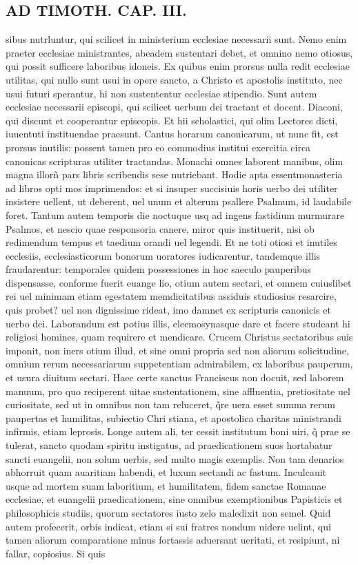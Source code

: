 \documentclass{article}
\begin{document}
\begin{pages}
\section*{AD TIMOTH. CAP. III. }
\marginpar{[ p.501 ]}\pstart sibus nutrluntur, qui scilicet in ministerium ecclesiae necessarii sunt. Nemo enim praeter ecclesiae ministrantes, abeadem sustentari debet, et omnino nemo otiosus, qui possit sufficere laboribus idoneis. Ex quibus enim prorsus nulla redit ecclesiae utilitas, qui nullo sunt usui in opere sancto, a Christo et apostolis instituto, nec usui futuri sperantur, hi non sustententur ecclesiae stipendio. Sunt autem ecclesiae necessarii episcopi, qui scilicet uerbum dei tractant et docent. Diaconi, qui discunt et cooperantur episcopis. Et hii scholastici, qui olim Lectores dicti, iuuentuti instituendae praesunt. Cantus horarum canonicarum, ut nunc fit, est prorsus inutilis: possent tamen pro eo commodius institui exercitia circa canonicas scripturas utiliter tractandas. Monachi omnes laborent manibus, olim magna illorñ pars libris scribendis sese nutriebant. Hodie apta essentmonasteria ad libros opti mos imprimendos: et si insuper succisiuis horis uerbo dei utiliter insistere uellent, ut deberent, uel unum et alterum psallere Psalmum, id laudabile foret. Tantum autem temporis die noctuque usq ad ingens fastidium murmurare Psalmos, et nescio quae responsoria canere, miror quis instituerit, nisi ob redimendum tempus et taedium orandi uel legendi. Et ne toti otiosi et inutiles ecclesiis, ecclesiasticorum bonorum uoratores iudicarentur, tandemque illis fraudarentur: temporales quidem possessiones in hoc saeculo pauperibus dispensasse, conforme fuerit euange lio, otium autem sectari, et omnem cuiuslibet rei uel minimam etiam egestatem memdicitatibus assiduis studiosius resarcire, quis probet? uel non dignissime rideat, imo damnet ex scripturis canonicis et uerbo dei. Laborandum est potius illis, eleemosynasque dare et facere studeant hi religiosi homines, quam requirere et mendicare. Crucem Christus sectatoribus suis imponit, non iners otium illud, et sine omni propria sed non aliorum solicitudine, omnium rerum necessariarum suppetentiam admirabilem, ex laboribus pauperum, et usura diuitum sectari. Haec certe sanctus Franciscus non docuit, sed laborem manuum, pro quo reciperent uitae sustentationem, sine affluentia, pretiositate uel curiositate, sed ut in omnibus non tam reluceret, q̃re uera esset summa rerum paupertas et humilitas, subiectio Chri stiana, et apostolica charitas ministrandi infirmis, etiam leprosis. Longe autem ali, ter cessit institutum boni uiri, q̃ prae se tulerat, sancto quodam spiritu instigatus, ad praedicationem suos hortabatur sancti euangelii, non solum uerbis, sed multo magis exemplis. Non tam denarios abhorruit quam auaritiam habendi, et luxum sectandi ac fastum. Inculcauit usque ad mortem suam laboritium, et humilitatem, fidem sanctae Romanae ecclesiae, et euangelii praedicationem, sine omnibus exemptionibus Papisticis et philosophicis studiis, quorum sectatores iusto zelo maledixit non semel. Quid autem profecerit, orbis indicat, etiam si sui fratres nondum uidere uelint, qui tamen aliorum comparatione minus fortassis aduersant ueritati, et resipiunt, ni fallar, copiosius. Si quis 
\end{pages}
\end{document}
